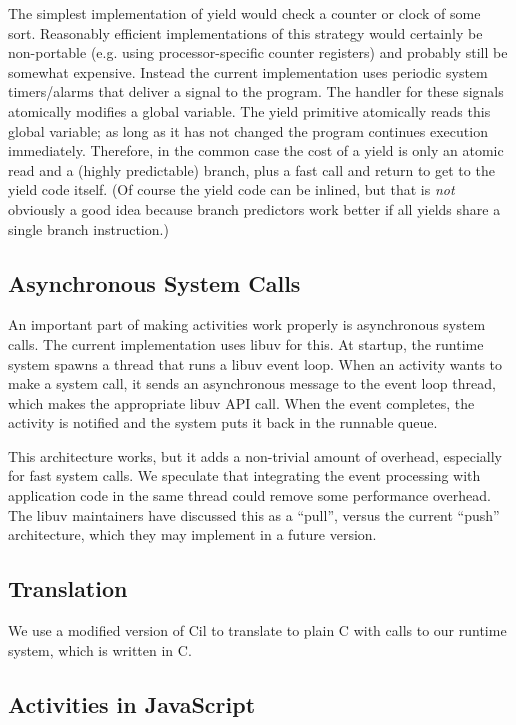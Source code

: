 \documentclass[a4paper,UKenglish,cleveref, autoref]{lipics-v2019}
\begin{document}
The simplest implementation of yield would check a counter or clock of some sort.
Reasonably efficient implementations of this strategy would certainly be non-portable (e.g. using processor-specific counter registers) and probably still be somewhat expensive.
Instead the current \charcoal{} implementation uses periodic system timers/alarms that deliver a signal to the program.
The handler for these signals atomically modifies a global variable.
The yield primitive atomically reads this global variable; as long as it has not changed the program continues execution immediately.
Therefore, in the common case the cost of a yield is only an atomic read and a (highly predictable) branch, plus a fast call and return to get to the yield code itself.
(Of course the yield code can be inlined, but that is \emph{not} obviously a good idea because branch predictors work better if all yields share a single branch instruction.)

\subsection{Asynchronous System Calls}

An important part of making activities work properly is asynchronous system calls.
The current \charcoal{} implementation uses libuv for this.
At startup, the runtime system spawns a thread that runs a libuv event loop.
When an activity wants to make a system call, it sends an asynchronous message to the event loop thread, which makes the appropriate libuv API call.
When the event completes, the activity is notified and the system puts it back in the runnable queue.

This architecture works, but it adds a non-trivial amount of overhead, especially for fast system calls.
We speculate that integrating the event processing with application code in the same thread could remove some performance overhead.
The libuv maintainers have discussed this as a ``pull'', versus the current ``push'' architecture, which they may implement in a future version.

\subsection{Translation}

We use a modified version of Cil \cite{Necula2002} to translate \charcoal{} to plain C with calls to our runtime system, which is written in C.

\subsection{Activities in JavaScript}
\end{document}
